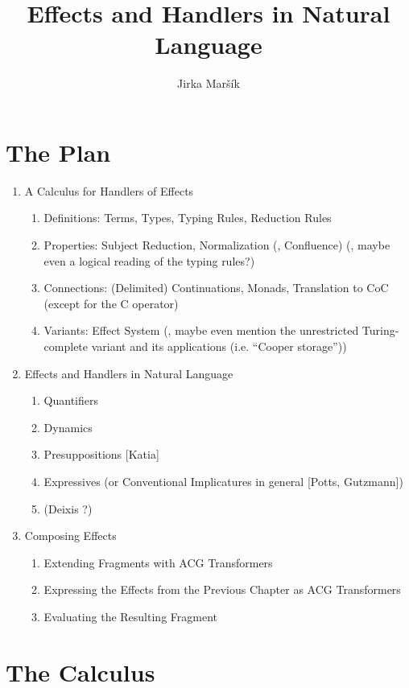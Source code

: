 \documentclass{article}
\title{Effects and Handlers in Natural Language}
\author{Jirka Maršík}
\begin{document}
\maketitle


\section{The Plan}

\begin{enumerate}
\item A Calculus for Handlers of Effects
  \begin{enumerate}
  \item Definitions: Terms, Types, Typing Rules, Reduction Rules
  \item Properties: Subject Reduction, Normalization (, Confluence) (,
    maybe even a logical reading of the typing rules?)
  \item Connections: (Delimited) Continuations, Monads, Translation to CoC
    (except for the C operator)
  \item Variants: Effect System (, maybe even mention the unrestricted
    Turing-complete variant and its applications (i.e. ``Cooper storage''))
  \end{enumerate}
\item Effects and Handlers in Natural Language
  \begin{enumerate}
  \item Quantifiers
  \item Dynamics
  \item Presuppositions [Katia]
  \item Expressives (or Conventional Implicatures in general [Potts, Gutzmann])
  \item (Deixis ?)
  \end{enumerate}
\item Composing Effects
  \begin{enumerate}
  \item Extending Fragments with ACG Transformers
  \item Expressing the Effects from the Previous Chapter as ACG Transformers
  \item Evaluating the Resulting Fragment
  \end{enumerate}
\end{enumerate}

\section{The Calculus}
\end{document}
